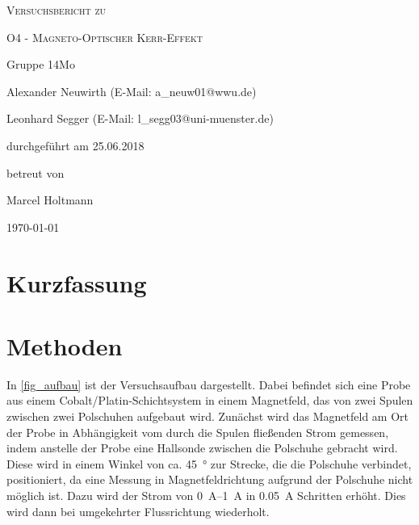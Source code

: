 \documentclass[
	a4paper,
	12pt,
	pagesize,
	ngerman
]{scrartcl}
\begin{document}
	
	\begin{titlepage}
		\centering
		{\scshape\LARGE Versuchsbericht zu \par}
		\vspace{1cm}
		{\scshape\huge O4 - Magneto-Optischer Kerr-Effekt \par}
		\vspace{2.5cm}
		{\LARGE Gruppe 14Mo \par}
		\vspace{0.5cm}
		
		{\large Alexander Neuwirth (E-Mail: a\_neuw01@wwu.de) \par}
		{\large Leonhard Segger (E-Mail: l\_segg03@uni-muenster.de) \par}
		\vfill
		
		durchgeführt am 25.06.2018\par
		betreut von\par
		{\large Marcel Holtmann} %
		
		\vfill
		
		{\large \today\par}
	\end{titlepage}
	\tableofcontents
	\newpage


	\section{Kurzfassung}
	
	\section{Methoden}
	In \cref{fig_aufbau} ist der Versuchsaufbau dargestellt.
	Dabei befindet sich eine Probe aus einem Cobalt/Platin-Schichtsystem in einem Magnetfeld, das von zwei Spulen zwischen zwei Polschuhen aufgebaut wird.
	Zunächst wird das Magnetfeld am Ort der Probe in Abhängigkeit vom durch die Spulen fließenden Strom gemessen, indem anstelle der Probe eine Hallsonde zwischen die Polschuhe gebracht wird.
	Diese wird in einem Winkel von ca. \SI{45}{\degree} zur Strecke, die die Polschuhe verbindet, positioniert, da eine Messung in Magnetfeldrichtung aufgrund der Polschuhe nicht möglich ist.
	Dazu wird der Strom von \SIrange{0}{1}{\ampere} in \SI{0,05}{\ampere} Schritten erhöht.
	Dies wird dann bei umgekehrter Flussrichtung wiederholt.
\end{document}
